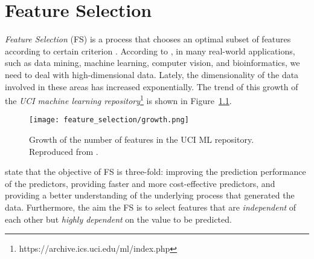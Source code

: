 \chapter{Feature Selection}
\label{ch:feature-selection}

\textit{Feature Selection} (FS) is a process that chooses an optimal subset of features according to certain criterion \citep{liu2012feature}. According to \citet{sammut2017encyclopedia}, in many real-world applications, such as data mining, machine learning, computer vision, and bioinformatics, we need to deal with high-dimensional data. Lately, the dimensionality of the data involved in these areas has increased exponentially. The trend of this growth of the \textit{UCI machine learning repository}\footnote{https://archive.ics.uci.edu/ml/index.php} is shown in Figure~\ref{fig:fs_growth}.

\begin{figure}
  \texttt{[image: feature\_selection/growth.png]}
  \caption{Growth of the number of features in the UCI ML repository. Reproduced from \citet{sammut2017encyclopedia}.}
  \label{fig:fs_growth}
\end{figure}

\citet{guyon2003introduction} state that the objective of FS is three-fold: improving the prediction performance of the predictors, providing faster and more cost-effective predictors, and providing a better understanding of the underlying process that generated the data. Furthermore, the aim the FS is to select features that are \textit{independent} of each other but \textit{highly dependent} on the value to be predicted.


